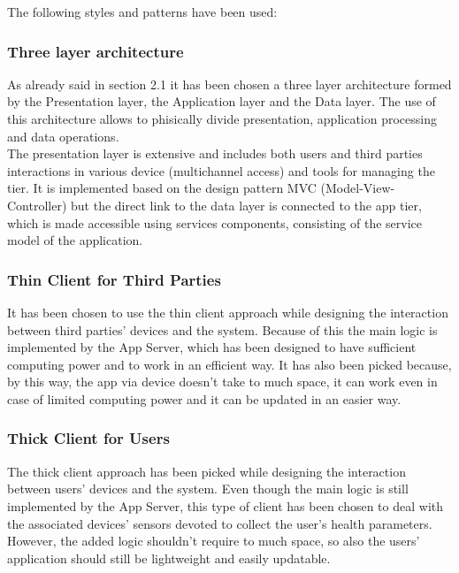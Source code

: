 The following styles and patterns have been used:

\subsubsection{Three layer architecture}
As already said in section 2.1 it has been chosen a three layer architecture formed by the Presentation layer, the Application layer and the Data layer. The use of this architecture allows to phisically divide presentation, application processing and data operations.\\
The presentation layer is extensive and includes both users and third parties interactions in various device (multichannel access) and tools for managing the tier. It is implemented based on the design pattern MVC (Model-View-Controller)  but the direct link to the data layer is connected to the app tier, which is made accessible using services components, consisting of the service model of the application.

\subsubsection{Thin Client for Third Parties}
It has been chosen to use the thin client approach while designing the interaction between third parties' devices and the system. Because of this the main logic is implemented by the App Server, which has been designed to have sufficient computing power and to work in an efficient way. It has also been picked because, by this way, the app via device doesn't take to much space, it can work even in case of limited computing power and it can be updated in an easier way.

\subsubsection{Thick Client for Users}
The thick client approach has been picked while designing the interaction between users' devices and the system. Even though the main logic is still implemented by the App Server, this type of client has been chosen to deal with the associated devices' sensors devoted to collect the user's health parameters. However, the added logic shouldn't require to much space, so also the users' application should still be lightweight and easily updatable.


